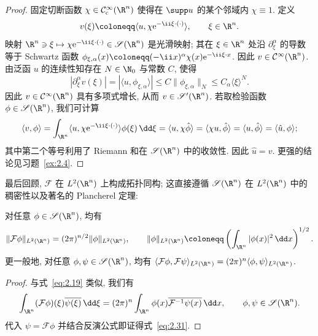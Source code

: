 \begin{proof}
固定切断函数 $\chi \in \SmoothComp(\R^n)$ 使得在 $\supp u$ 的某个邻域内 $\chi \equiv 1$. 定义
\begin{equation}\label{eq:2.28}
    v(\xi) \defeq \langle u, \chi \ee^{-\ii \xi \cdot (\cdot)} \rangle, \qquad \xi \in \R^n.
\end{equation}
映射 $\R^n \ni \xi \mapsto \chi \ee^{-\ii \xi \cdot (\cdot)} \in \Schwartz(\R^n)$ 是光滑映射; 其在 $\xi \in \R^n$ 处沿 $\partial_\xi^\alpha$ 的导数等于 Schwartz 函数 $\phi_{\xi, \alpha}(x) \defeq (-\ii x)^\alpha \chi(x) \ee^{-\ii \xi \cdot x}$. 因此 $v \in \Smooth(\R^n)$. 由泛函 $u$ 的连续性知存在 $N \in \N_0$ 与常数 $C$, 使得
\begin{equation}\label{eq:2.29}
    |\partial_\xi^\alpha v(\xi)| = |\langle u, \phi_{\xi, \alpha} \rangle| \le C \|\phi_{\xi, \alpha}\|_N \le C_\alpha \langle \xi \rangle^N.
\end{equation}
因此 $v \in \Smooth(\R^n)$ 具有多项式增长, 从而 $v \in \TempDistr(\R^n)$. 若取检验函数 $\phi \in \Schwartz(\R^n)$, 我们可计算
\begin{equation}\label{eq:2.30}
    \langle v, \phi \rangle = \int_{\R^n} \langle u, \chi \ee^{-\ii \xi \cdot (\cdot)} \rangle \phi(\xi) \,\dd\xi = \langle u, \chi \hat{\phi} \rangle = \langle \chi u, \hat{\phi} \rangle = \langle u, \hat{\phi} \rangle = \langle \hat{u}, \phi \rangle;
\end{equation}
其中第二个等号利用了 Riemann 和在 $\Schwartz(\R^n)$ 中的收敛性. 因此 $\hat{u} = v$. 更强的结论见习题~\ref{ex:2.4}.
\end{proof}

最后回顾, $\mathcal{F}$ 在 $L^2(\R^n)$ 上构成拓扑同构; 这直接遵循 $\Schwartz(\R^n)$ 在 $L^2(\R^n)$ 中的稠密性以及著名的 Plancherel 定理:

\begin{proposition}[Plancherel 定理]\label{prop:2.12}
对任意 $\phi \in \Schwartz(\R^n)$, 均有
\begin{equation}\label{eq:2.31}
    \|\mathcal{F} \phi\|_{L^2(\R^n)} = (2\pi)^{n/2} \|\phi\|_{L^2(\R^n)}, \qquad \|\phi\|_{L^2(\R^n)} \defeq \left( \int_{\R^n} |\phi(x)|^2 \,\dd x \right)^{1/2}.
\end{equation}
更一般地, 对任意 $\phi, \psi \in \Schwartz(\R^n)$, 均有 $\langle \mathcal{F} \phi, \mathcal{F} \psi \rangle_{L^2(\R^n)} = (2\pi)^n \langle \phi, \psi \rangle_{L^2(\R^n)}$.
\end{proposition}

\begin{proof}
与式~\eqref{eq:2.19} 类似, 我们有
\begin{equation}\label{eq:2.32}
    \int_{\R^n} (\mathcal{F} \phi)(\xi) \overline{\psi(\xi)} \,\dd\xi = (2\pi)^n \int_{\R^n} \phi(x) \overline{\mathcal{F}^{-1} \psi(x)} \,\dd x, \qquad \phi, \psi \in \Schwartz(\R^n).
\end{equation}
代入 $\psi = \mathcal{F} \phi$ 并结合反演公式即证得式~\eqref{eq:2.31}.
\end{proof}


